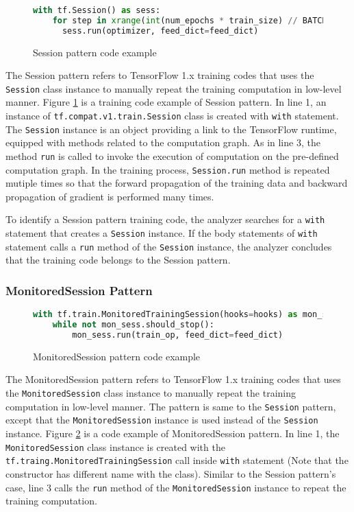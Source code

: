 \begin{figure}[!ht]
\begin{lstlisting}[language=Python]
with tf.Session() as sess:
    for step in xrange(int(num_epochs * train_size) // BATCH_SIZE):
      sess.run(optimizer, feed_dict=feed_dict)
\end{lstlisting}
\caption{Session pattern code example}
\label{fig:sessionpattern}
\end{figure}
The Session pattern refers to TensorFlow 1.x training codes that
uses the {\tt Session} class instance to manually repeat the training 
computation in low-level manner.
Figure \ref{fig:sessionpattern} is a training code example of 
Session pattern.
In line 1, an instance of {\tt tf.compat.v1.train.Session} class is 
created with {\tt with} statement.
The {\tt Session} instance is an object providing a link to 
the TensorFlow runtime, equipped with methods related to the computation graph.
As in line 3, the method {\tt run} is called to invoke the
execution of computation on the pre-defined computation graph.
In the training process, {\tt Session.run} method is repeated mutiple times
so that the forward propagation of the training data and
backward propagation of gradient is performed many times.

To identify a Session pattern training code,
the analyzer searches for a {\tt with} statement that creates a
{\tt Session} instance.
If the body statements of {\tt with} statement calls a 
{\tt run} method of the {\tt Session} instance,
the analyzer concludes that the training code belongs to the Session pattern.

\subsubsection{MonitoredSession Pattern}

\begin{figure}[!ht]
  \begin{lstlisting}[language=Python]
with tf.train.MonitoredTrainingSession(hooks=hooks) as mon_sess:
    while not mon_sess.should_stop():
        mon_sess.run(train_op, feed_dict=feed_dict)
  \end{lstlisting}
  \caption{MonitoredSession pattern code example}
  \label{fig:monsesspattern}
\end{figure}

The MonitoredSession pattern refers to TensorFlow 1.x training codes that
uses the {\tt MonitoredSession} class instance to manually repeat
the training computation in low-level manner.
The pattern is same to the {\tt Session} pattern, except that the
{\tt MonitoredSession} instance is used instead of the {\tt Session} instance.
Figure \ref{fig:monsesspattern} is a code example of MonitoredSession pattern.
In line 1, the {\tt MonitoredSession} class instance is created with
the {\tt tf.traing.MonitoredTrainingSession} call inside {\tt with} statement
(Note that the constructor has different name with the class).
Similar to the Session pattern's case, line 3 calls the {\tt run} method of the
{\tt MonitoredSession} instance to repeat the training computation.

